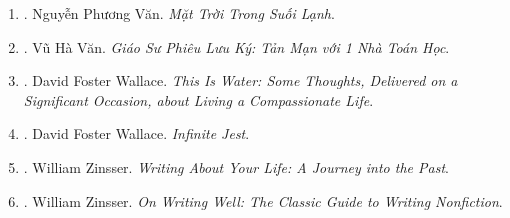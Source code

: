 \documentclass{article}
\begin{document}
\begin{enumerate}
	\item \cite{Van2022}. Nguyễn Phương Văn. \textit{Mặt Trời Trong Suối Lạnh}.\hfill{}
	\item \cite{VanVu2022}. Vũ Hà Văn. \textit{Giáo Sư Phiêu Lưu Ký: Tản Mạn với 1 Nhà Toán Học}.\hfill{}
	\item \cite{Wallace2009}. David Foster Wallace. \textit{This Is Water: Some Thoughts, Delivered on a Significant Occasion, about Living a Compassionate Life}.\hfill{}
	\item \cite{Wallace2011}. David Foster Wallace. \textit{Infinite Jest}.\hfill{}
	\item \cite{Zinsser2005}. William Zinsser. \textit{Writing About Your Life: A Journey into the Past}.
	\item \cite{Zinsser2016}. William Zinsser. \textit{On Writing Well: The Classic Guide to Writing Nonfiction}.\hfill{\sf[downloaded]}
\end{enumerate}

\end{document}
